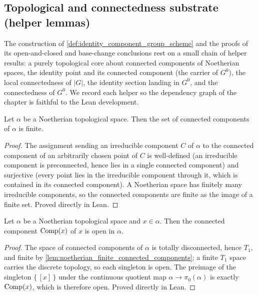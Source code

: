 \subsection{Topological and connectedness substrate (helper lemmas)}
\label{subsec:identity_component_substrate}

The construction of \cref{def:identity_component_group_scheme} and the
proofs of its open-and-closed and base-change conclusions rest on a small
chain of helper results: a purely topological core about connected
components of Noetherian spaces, the identity point and its connected
component (the carrier of \(G^0\)), the local connectedness of \(|G|\), the
identity section landing in \(G^0\), and the connectedness of \(G^0\). We
record each helper so the dependency graph of the chapter is faithful to
the Lean development.

\begin{lemma}
  \label{lem:noetherian_finite_connected_components}
  Let \(\alpha\) be a Noetherian topological space. Then the set of
  connected components of \(\alpha\) is finite.
\end{lemma}
\begin{proof}
  The assignment sending an irreducible component \(C\) of \(\alpha\) to the
  connected component of an arbitrarily chosen point of \(C\) is
  well-defined (an irreducible component is preconnected, hence lies in a
  single connected component) and surjective (every point lies in the
  irreducible component through it, which is contained in its connected
  component). A Noetherian space has finitely many irreducible components,
  so the connected components are finite as the image of a finite set.
  Proved directly in Lean.
\end{proof}

\begin{lemma}

  \label{lem:noetherian_isopen_connected_component}
  Let \(\alpha\) be a Noetherian topological space and \(x \in \alpha\). Then
  the connected component \(\operatorname{Comp}(x)\) of \(x\) is open in \(\alpha\).
\end{lemma}
\begin{proof}
  The space of connected components of \(\alpha\) is totally disconnected,
  hence \(T_1\), and finite by
  \cref{lem:noetherian_finite_connected_components}; a finite \(T_1\) space
  carries the discrete topology, so each singleton is open. The preimage of
  the singleton \(\{\,[x]\,\}\) under the continuous quotient map
  \(\alpha \to \pi_0(\alpha)\) is exactly \(\operatorname{Comp}(x)\), which is
  therefore open. Proved directly in Lean.
\end{proof}

